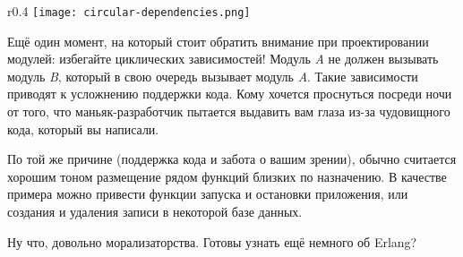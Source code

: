 \begin{wrapfigure}{r}{0.4\linewidth}
    \texttt{[image: circular-dependencies.png]}
\end{wrapfigure}
Ещё один момент, на который стоит обратить внимание при проектировании модулей: избегайте циклических зависимостей!
Модуль \emph{A} не должен вызывать модуль \emph{B}, который в свою очередь вызывает модуль \emph{A}.
Такие зависимости приводят к усложнению поддержки кода.
Кому хочется проснуться посреди ночи от того, что маньяк\--разработчик пытается выдавить вам глаза из\--за чудовищного кода, который вы написали.

По той же причине (поддержка кода и забота о вашим зрении), обычно считается хорошим тоном размещение рядом функций близких по назначению.
В качестве примера можно привести функции запуска и остановки приложения, или создания и удаления записи в некоторой базе данных.

Ну что, довольно морализаторства.
Готовы узнать ещё немного об Erlang?
